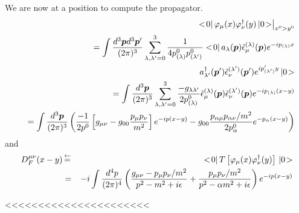 We are now at a position to compute the propagator.
\begin{eqnarray}
&&
\left.
\bra 0 \braend \varphi_\mu (x) \varphi^\dagger_\nu (y) \ketend 0 \ket
\right|_{x^0 > y^0}
\nonumber\\
&&
=
\int
\frac{d^3 \bld{p} d^3 \bld{p}' }{(2\pi)^3}
\sum_{\lambda, \lambda' = 0}^3
\frac{1}{4 p^0_{(\lambda)} p^0_{(\lambda')}}
\bra 0 \braend 
a_\lambda (\bld{p}) \tilde{\epsilon}_\mu^{(\lambda)} (\bld{p}) e^{-i p_{(\lambda)} x}
\nonumber\\
&&
\hspace{35mm}
a_{\lambda'}^\dagger (\bld{p}') \tilde{\epsilon}_\nu^{(\lambda')} (\bld{p}') e^{i p_{(\lambda')}' y}
\ketend 0 \ket
\nonumber\\
&&
=
\int
\frac{d^3 \bld{p} }{(2\pi)^3}
\sum_{\lambda, \lambda' = 0}^3
\frac{-g_{\lambda \lambda'}}{2  p^0_{(\lambda)}}
 \tilde{\epsilon}_\mu^{(\lambda)} (\bld{p})
\tilde{\epsilon}_\nu^{(\lambda')} (\bld{p})  e^{-i p_{(\lambda)}( x- y)}
\nonumber\\
&&
=
\int
\frac{d^3 \bld{p} }{(2\pi)^3}
\left(
\frac{-1}{2 p^0}
\left[
g_{\mu \nu} - g_{00} \frac{p_\mu p_\nu}{m^2}
\right] e^{- ip (x - y)}
-
g_{00}
\frac{p_{\alpha \mu} p_{\alpha \nu} / m^2}{2 p^0_\alpha}
e^{- p_\alpha (x-y)}
\right)
\nonumber\\
\end{eqnarray}
and
\begin{eqnarray}
D_F^{\mu \nu} (x-y)
&\,\mbox{$\stackrel{\leftarrow}{=}$}\,&
<\! 0 |\, T\left[ \varphi_\mu (x) \varphi^\dagger_\nu (y)\right] \,| 0 \!>
\nonumber\\
&=&
-i
\int
\frac{d^4 p }{(2\pi)^4}
\left(
\frac{g_{\mu \nu} -  p_\mu p_\nu / m^2}{p^2 - m^2 + i\epsilon}
+
\frac{p_\mu p_\nu / m^2}{p^2 - \alpha m^2 + i\epsilon}
\right)
e^{- ip (x - y)}
\nonumber\\
\end{eqnarray}


\bigskip
<<<<<<<<<<<<<<<<<<<<<<



\begin{comment}
\\
&&
(= -\partial_mu \varphi_\nu^* \cdot \partial^\mu \varphi^\nu + m^2 \varphi_\mu^* \varphi^\mu
+ \partial_mu \varphi_\nu^* \cdot \partial^\nu \varphi^\mu)
\nonumber
\end{comment}
